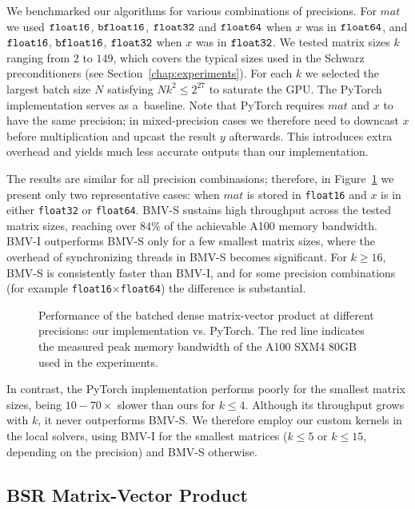 \documentclass[11pt]{article}
\theoremstyle{definition}
\theoremstyle{theorem}
\begin{document}
We benchmarked our algorithms for various combinations of precisions.
For $mat$ we used $\verb|float16|$, $\verb|bfloat16|$, $\verb|float32|$
and $\verb|float64|$ when $x$ was in $\verb|float64|$, and
$\verb|float16|$, $\verb|bfloat16|$, $\verb|float32|$ when $x$ was in $\verb|float32|$.
We tested matrix sizes $k$ ranging from $2$ to $149$, which covers the
typical sizes used in the Schwarz preconditioners (see
Section~\ref{chap:experiments}).
For each $k$ we selected
the largest batch size $N$ satisfying $Nk^2\leq 2^{27}$
to saturate the GPU. The PyTorch implementation serves as a~baseline.
Note that PyTorch requires $mat$ and $x$ to have the same precision;
in mixed\nobreakdash-precision cases we therefore need to downcast $x$ before
multiplication and upcast the result $y$ afterwards. This introduces extra
overhead and yields much less accurate outputs than our implementation.

The results are similar for all precision combinasions; therefore, in
Figure~\ref{fig:matrix_vec_tput} we present only
two representative cases: when $mat$ is stored in \verb|float16| and
$x$ is in either \verb|float32| or \verb|float64|.
BMV-S sustains high throughput across the tested matrix sizes, reaching
over $84\%$ of the achievable A100 memory bandwidth.
BMV-I outperforms BMV-S only for a few smallest matrix sizes, where the
overhead of synchronizing threads in BMV-S becomes significant.
For $k\geq 16$, BMV-S is consistently faster
than BMV-I, and for some precision combinations (for example
\verb|float16|$\times$\verb|float64|) the difference is substantial.

\begin{figure}
  \centering
  
  \caption{Performance of the batched dense matrix-vector product at different
  precisions: our implementation vs. PyTorch. The red line indicates the
  measured peak memory bandwidth of the A100 SXM4 80GB used in the experiments.}
  \label{fig:matrix_vec_tput}
\end{figure}

In contrast, the
PyTorch implementation performs poorly for the smallest matrix sizes, being
$10-70\times$ slower than ours for $k\leq 4$. Although its throughput grows with $k$,
it never outperforms BMV\nobreakdash-S.
We therefore employ our custom kernels in the local solvers, using BMV-I
for the smallest matrices ($k\leq 5$ or $k\leq 15$, depending on the precision)
and BMV-S otherwise.

\subsection{BSR Matrix-Vector Product}
\label{sec:bsr-matrix-vector-product}
\end{document}
